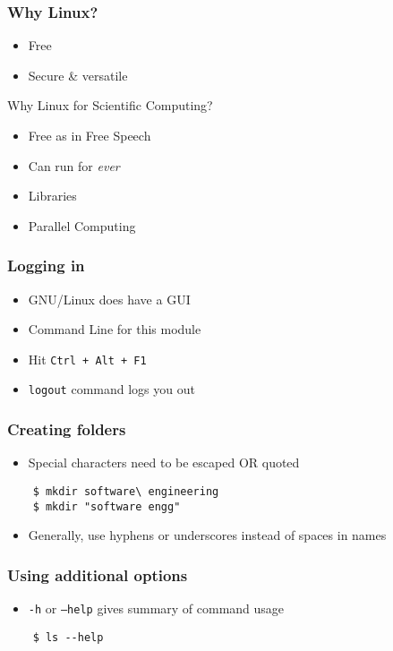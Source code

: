 \documentclass[12pt,compress]{beamer}
\begin{document}
\begin{frame}[fragile]
  \frametitle{Why Linux?}
    \begin{itemize}
    \item Free 
    \item Secure \& versatile
    \end{itemize}

    \begin{block}{Why Linux for Scientific Computing?}
      \begin{itemize}
        \item Free as in Free Speech
        \item Can run for \emph{ever}
        \item Libraries
        \item Parallel Computing
      \end{itemize}
    \end{block}
\end{frame}

\begin{frame}[fragile]
  \frametitle{Logging in}
  \begin{itemize}
  \item GNU/Linux does have a GUI
  \item Command Line for this module
  \item Hit \texttt{Ctrl + Alt + F1}
  \item \texttt{logout} command logs you out
  \end{itemize}
\end{frame}

\begin{frame}[fragile]
  \frametitle{Creating folders}
  \begin{itemize}
  \item Special characters need to be escaped OR quoted
  \end{itemize}
  \begin{lstlisting}
    $ mkdir software\ engineering
    $ mkdir "software engg"
  \end{lstlisting} 
  \begin{itemize}
  \item Generally, use hyphens or underscores instead of spaces in names
  \end{itemize}
\end{frame}

\begin{frame}[fragile]
  \frametitle{Using additional options}

  \begin{itemize}
  \item \texttt{-h} or \texttt{--help} gives summary of command usage
  \end{itemize}
  \begin{lstlisting}
    $ ls --help
  \end{lstlisting} %
\end{frame}
\end{document}
